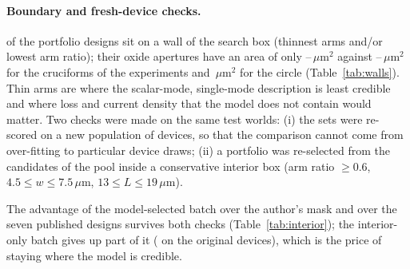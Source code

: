 \paragraph{Boundary and fresh-device checks.} \nWall{} of the \nQ{} portfolio designs sit on a wall of the search box (thinnest arms and/or lowest arm ratio); their oxide apertures have an area of only \wallAreaLo--\wallAreaHi\,$\mu$m$^2$
against --\,$\mu$m$^2$ for the cruciforms of the experiments and \circleArea\,$\mu$m$^2$ for the circle (Table~\ref{tab:walls}). Thin arms are where the scalar-mode, single-mode description is least credible and where loss and current density that the model does not contain would matter.
Two checks were made on the same test worlds: (i) the sets were re-scored on a new population of \freshDev{} devices, so that the comparison cannot come from over-fitting to particular device draws; (ii) a portfolio was re-selected from the \nPoolInterior{} candidates of the pool inside a conservative interior box (arm ratio $\ge0.6$, $4.5\le w\le7.5\,\mu$m, $13\le L\le19\,\mu$m).
\begin{table}[H]\centering\small\tabInterior\caption{Fresh device population; same unseen worlds.}\label{tab:interior}\end{table}
\begin{table}[H]\centering\small\tabWalls\caption{Portfolio designs with the area of their oxide aperture in the placeholder process.}\label{tab:walls}\end{table}
The advantage of the model-selected batch over the author's mask and over the seven published designs survives both checks (Table~\ref{tab:interior}); the interior-only batch gives up part of it (\interiorSame{} on the original devices), which is the price of staying where the model is credible.
